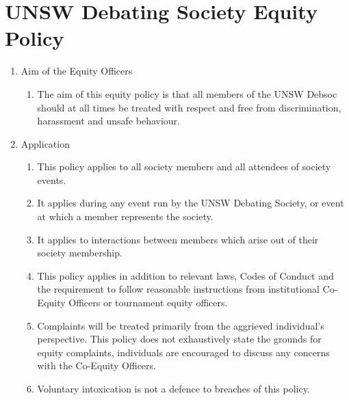 \newpage
\section{UNSW Debating Society Equity Policy}

\begin{enumerate}
\item Aim of the Equity Officers
  \begin{enumerate}
  \item The aim of this equity policy is that all members of the UNSW Debsoc should at all times be treated with respect and free from discrimination, harassment and unsafe behaviour.
  \end{enumerate}

\item Application
  \begin{enumerate}
  \item This policy applies to all society members and all attendees of society events.
  \item It applies during any event run by the UNSW Debating Society, or event at which a member represents the society.
  \item It applies to interactions between members which arise out of their society membership.
  \item This policy applies in addition to relevant laws, Codes of Conduct and the requirement to follow reasonable instructions from institutional Co-Equity Officers or tournament equity officers.
  \item Complaints will be treated primarily from the aggrieved individual’s perspective. This policy does not exhaustively state the grounds for equity complaints, individuals are encouraged to discuss any concerns with the Co-Equity Officers.
  \item Voluntary intoxication is not a defence to breaches of this policy.
  \end{enumerate}


\end{enumerate}
